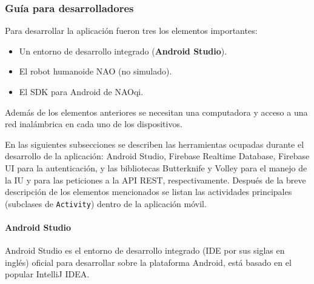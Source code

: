 

\subsubsection{Guía para desarrolladores}
\label{\detokenize{dev_docs::doc}}\label{\detokenize{dev_docs:guia-para-desarrolladores}}

Para desarrollar la aplicación fueron tres los elementos importantes:
\begin{itemize}
\item {} 
Un entorno de desarrollo integrado (\textbf{Android Studio}).

\item {} 
El robot humanoide NAO (no simulado).

\item {} 
El SDK para Android de NAOqi.

\end{itemize}

Además de los elementos anteriores se necesitan una computadora y acceso a una red inalámbrica
en cada uno de los dispositivos.

En las siguientes subsecciones se describen las herramientas ocupadas durante 
el desarrollo de la aplicación:
Android Studio, Firebase Realtime
Database, Firebase UI para la autenticación, y las bibliotecas Butterknife
y Volley para el manejo de la IU y para las peticiones a la API REST,
respectivamente. Después de la breve descripción de los elementos
mencionados se listan las actividades principales (subclases de \texttt{Activity}) dentro de la aplicación móvil.


\paragraph{Android Studio}
\label{\detokenize{dev_docs:android-studio}}
Android Studio es el entorno de desarrollo integrado (IDE por sus siglas en
inglés) oficial para desarrollar sobre la plataforma Android, está basado en
el popular IntelliJ IDEA.

